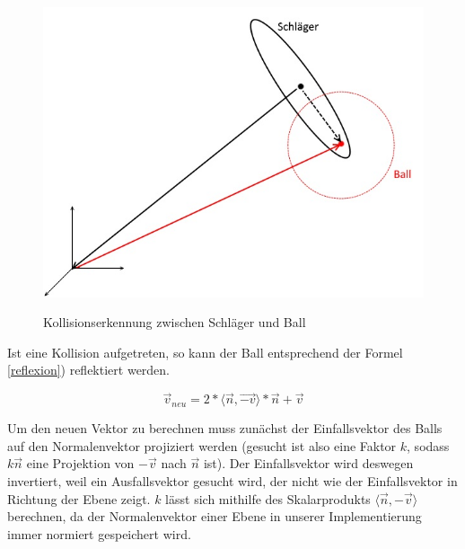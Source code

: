 \begin{figure}[h]
   \begin{center}
    \includegraphics[scale=0.4]{bilder/collisionRacket}\label{fig_colRacket}
   \end{center} 
    \caption{Kollisionserkennung zwischen Schläger und Ball}
        \label{fig_colRacket2}
\end{figure} 

Ist eine Kollision aufgetreten, so kann der Ball entsprechend der Formel \ref{reflexion}) reflektiert werden.

\begin{equation}	
\label{reflexion}
	\vec{v}_{neu} = 2* \langle \vec{n},\vec{-v} \rangle * \vec{n} + \vec{v}
\end{equation}

Um den neuen Vektor zu berechnen muss zunächst der Einfallsvektor des Balls auf den Normalenvektor projiziert werden (gesucht ist also eine Faktor $k$, sodass $k\vec{n}$ eine Projektion von $-\vec{v}$ nach $\vec{n}$ ist). Der Einfallsvektor wird deswegen invertiert, weil ein Ausfallsvektor gesucht wird, der nicht wie der Einfallsvektor in Richtung der Ebene zeigt. $k$ lässt sich mithilfe des Skalarprodukts $\langle\vec{n},-\vec{v}\rangle$ berechnen, da der Normalenvektor einer Ebene in unserer Implementierung immer normiert gespeichert wird.



